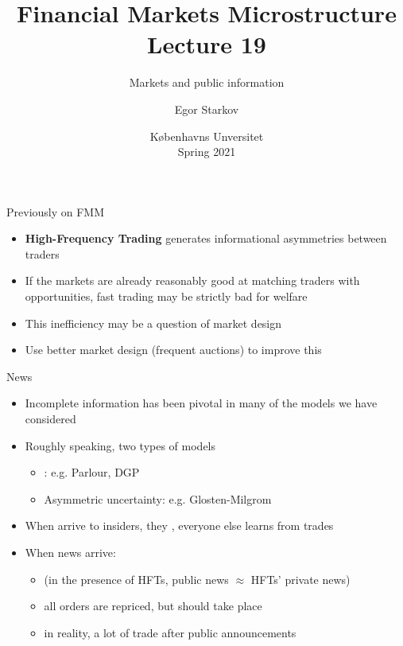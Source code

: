 \documentclass[english,10pt
,aspectratio=169
]{beamer}
\title{Financial Markets Microstructure \\ Lecture 19}
\subtitle{Markets and public information}
\author{Egor Starkov}
\date{K{\o}benhavns Unversitet \\
	Spring 2021}
\begin{document}
	\frame[plain]{\titlepage}


\begin{frame}{Previously on FMM}
	\begin{itemize}
		\item \textbf{High-Frequency Trading} generates informational asymmetries between traders
		\item If the markets are already reasonably good at matching traders with opportunities, fast trading may be strictly bad for welfare
		\item This inefficiency may be a question of market design
		\item Use better market design (frequent auctions) to improve this
	\end{itemize}
\end{frame}


\begin{frame}{News}
	\begin{itemize}
		\item Incomplete information has been pivotal in many of the models we have considered
		\item Roughly speaking, two types of models
		\begin{itemize}
			\item {}: e.g. Parlour, DGP
			\item \alert<1>{Asymmetric uncertainty}: e.g. Glosten-Milgrom
		\end{itemize}
		\pause
		\item When  arrive to insiders, they , everyone else learns from trades
		\item When  news arrive: \only<2>{...?}
		\pause
		\begin{itemize}
			\item (in the presence of HFTs, public news $\approx$ HFTs' private news)
			\item all orders are repriced, but  \alert<4>{should} take place
			\pause
			\item in reality, a lot of trade after public announcements
		\end{itemize}
	\end{itemize}
\end{frame}
\end{document}
